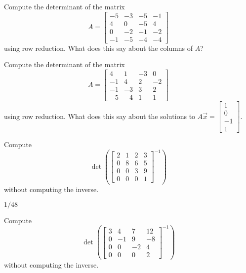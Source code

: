 \begin{exercise}\ansMark%
Compute the determinant of the matrix
\[ A = \begin{bmatrix}
-5 & -3 & -5 & -1\\
4 & 0 &-5 &  4\\
0&-2 &-1 &-2\\
-1& -5 &-4 &-4
\end{bmatrix}
\]
using row reduction. What does this say about the columns of $A$?
\end{exercise}

\begin{exercise}\ansMark%
Compute the determinant of the matrix
\[ A = \begin{bmatrix}
4  & 1 & -3 &  0\\
-1 &  4 &  2 & -2\\
-1 & -3 & 3 & 2\\
-5 & -4 & 1 & 1
\end{bmatrix}
\]
using row reduction. What does this say about the solutions to $A\vec{x} = \left[ \begin{smallmatrix} 1 \\ 0 \\ -1 \\ 1 \end{smallmatrix} \right]$.
\end{exercise}

\begin{exercise}
Compute
\begin{equation*}
\det \left( \begin{bmatrix}
2 & 1 & 2 & 3 \\
0 & 8 & 6 & 5 \\
0 & 0 & 3 & 9 \\
0 & 0 & 0 & 1
\end{bmatrix}^{-1}
\right)
\end{equation*}
without computing the inverse.
\end{exercise}
\comboSol{%
}
{%
$1/48$
}

\begin{exercise}\ansMark%
Compute
\begin{equation*}
\det \left( \begin{bmatrix}
3 & 4 & 7 & 12 \\
0 & -1 & 9 & -8 \\
0 & 0 & -2 & 4 \\
0 & 0 & 0 & 2
\end{bmatrix}^{-1}
\right)
\end{equation*}
without computing the inverse.
\end{exercise}

